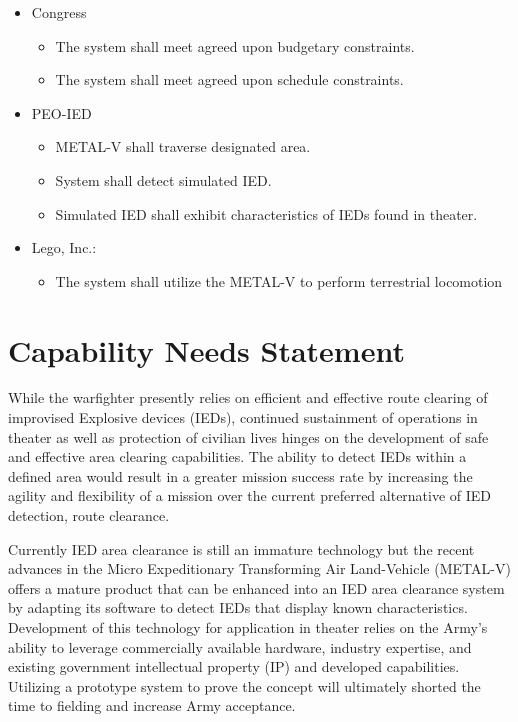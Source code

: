 \documentclass[letterpaper,10pt]{article}
\begin{document}
\begin{itemize}
\begin{itemize}
	\end{itemize}
	\item Congress
	\begin{itemize}
		\item The system shall meet agreed upon budgetary constraints.
		\item The system shall meet agreed upon schedule constraints.
	\end{itemize}
	\item PEO-IED
	\begin{itemize}
		\item METAL-V shall traverse designated area.
		\item System shall detect simulated IED.
		\item Simulated IED shall exhibit characteristics of IEDs found in theater.
	\end{itemize}
	\item Lego, Inc.:
	\begin{itemize}
		\item The system shall utilize the METAL-V to perform terrestrial locomotion
	\end{itemize}
\end{itemize}

\section{Capability Needs Statement}
While the warfighter presently relies on efficient and effective route clearing of improvised Explosive devices (IEDs), continued sustainment of operations in theater as well as protection of civilian lives hinges on the development of safe and effective area clearing capabilities.  The ability to detect IEDs within a defined area would result in a greater mission success rate by increasing the agility and flexibility of a mission over the current preferred alternative of IED detection, route clearance. 

Currently IED area clearance is still an immature technology but the recent advances in the Micro Expeditionary Transforming Air Land-Vehicle (METAL-V) offers a mature product that can be enhanced into an IED area clearance system by adapting its software to detect IEDs that display known characteristics. Development of this technology for application in theater relies on the Army's ability to leverage commercially available hardware, industry expertise, and existing government intellectual property (IP) and developed capabilities.  Utilizing a prototype system to prove the concept will ultimately shorted the time to fielding and increase Army acceptance.
\end{document}
